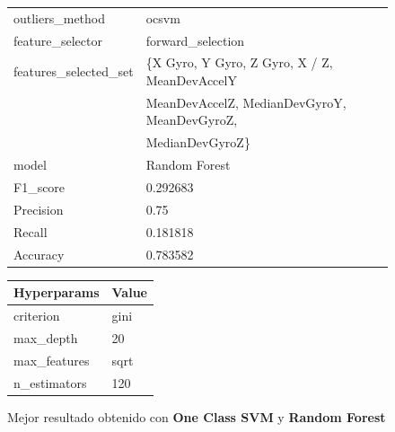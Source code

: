 \begin{appendices}
		\begin{figure}[htb]
			\centering
			\begin{tabular}{ll}
				\toprule
					  outliers\_method &                                              ocsvm \\
					 feature\_selector &                                  forward\_selection \\
				features\_selected\_set & \{X Gyro, Y Gyro, Z Gyro, X / Z, MeanDevAccelY\\
										&	MeanDevAccelZ, MedianDevGyroY, MeanDevGyroZ,\\ 
										& MedianDevGyroZ\} \\
								model &                                      Random Forest \\
							 F1\_score &                                           0.292683 \\
							Precision &                                               0.75 \\
							   Recall &                                           0.181818 \\
							 Accuracy &                                           0.783582 \\
				\bottomrule
			\end{tabular}
			\newline
			\newline
			
			\begin{tabular}{ll}
				\toprule
				 Hyperparams & Value \\
				\midrule
				   criterion &  gini \\
				   max\_depth &    20 \\
				max\_features &  sqrt \\
				n\_estimators &   120 \\
				\bottomrule
			\end{tabular}
			\caption{Mejor resultado obtenido con \textbf{One Class SVM} y \textbf{Random Forest}}
			\label{table:36}
		\end{figure}
\end{appendices}
